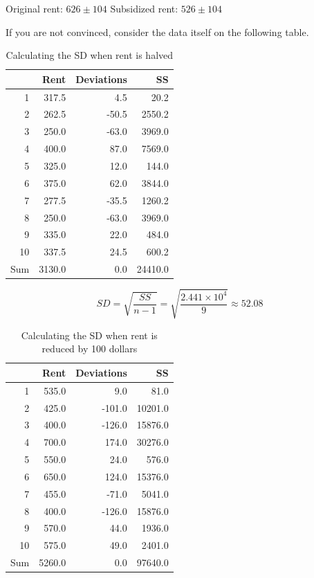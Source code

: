 \documentclass[11pt, chapterprefix=true]{scrbook}\usepackage[]{graphicx}\usepackage[]{color}
\begin{document}
\begin{center}
Original rent: $ 626 \pm 104 $ \hspace{2cm} Subsidized rent: $ 526 \pm 104 $
\end{center}
If you are not convinced, consider the data itself on the following table.

\begin{table}[ht]
\centering
\begin{tabular}{rrrr}
  \hline
 & Rent & Deviations & SS \\ 
  \hline
1 & 317.5 & 4.5 & 20.2 \\ 
  2 & 262.5 & -50.5 & 2550.2 \\ 
  3 & 250.0 & -63.0 & 3969.0 \\ 
  4 & 400.0 & 87.0 & 7569.0 \\ 
  5 & 325.0 & 12.0 & 144.0 \\ 
  6 & 375.0 & 62.0 & 3844.0 \\ 
  7 & 277.5 & -35.5 & 1260.2 \\ 
  8 & 250.0 & -63.0 & 3969.0 \\ 
  9 & 335.0 & 22.0 & 484.0 \\ 
  10 & 337.5 & 24.5 & 600.2 \\ 
  Sum & 3130.0 & 0.0 & 24410.0 \\ 
   \hline
\end{tabular}
\caption{Calculating the SD when rent is halved} 
\end{table}


$$ SD = \sqrt{ \frac{ SS}{n - 1}} = \sqrt{ \frac{ \ensuremath{2.441\times 10^{4}}}{9}} \approx 52.08 $$


\begin{table}[ht]
\centering
\begin{tabular}{rrrr}
  \hline
 & Rent & Deviations & SS \\ 
  \hline
1 & 535.0 & 9.0 & 81.0 \\ 
  2 & 425.0 & -101.0 & 10201.0 \\ 
  3 & 400.0 & -126.0 & 15876.0 \\ 
  4 & 700.0 & 174.0 & 30276.0 \\ 
  5 & 550.0 & 24.0 & 576.0 \\ 
  6 & 650.0 & 124.0 & 15376.0 \\ 
  7 & 455.0 & -71.0 & 5041.0 \\ 
  8 & 400.0 & -126.0 & 15876.0 \\ 
  9 & 570.0 & 44.0 & 1936.0 \\ 
  10 & 575.0 & 49.0 & 2401.0 \\ 
  Sum & 5260.0 & 0.0 & 97640.0 \\ 
   \hline
\end{tabular}
\caption{Calculating the SD when rent is reduced by 100 dollars} 
\end{table}
\end{document}
